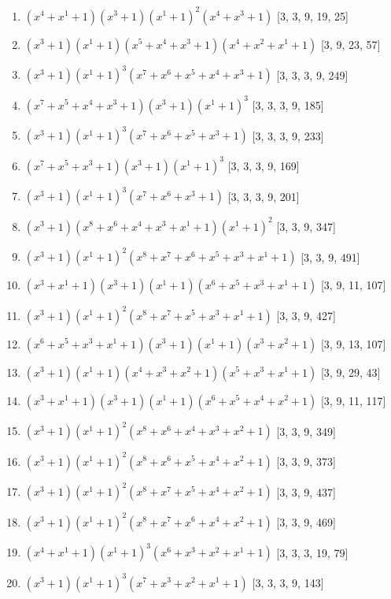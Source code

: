 \documentclass[10pt,twocolumn]{article}
\begin{document}
\begin{enumerate}
\item $(x^{4} + x^{1} + 1)(x^{3} + 1)(x^{1} + 1)^{2}(x^{4} + x^{3} + 1)$  [3, 3, 9, 19, 25]
\item $(x^{3} + 1)(x^{1} + 1)(x^{5} + x^{4} + x^{3} + 1)(x^{4} + x^{2} + x^{1} + 1)$  [3, 9, 23, 57]
\item $(x^{3} + 1)(x^{1} + 1)^{3}(x^{7} + x^{6} + x^{5} + x^{4} + x^{3} + 1)$  [3, 3, 3, 9, 249]
\item $(x^{7} + x^{5} + x^{4} + x^{3} + 1)(x^{3} + 1)(x^{1} + 1)^{3}$  [3, 3, 3, 9, 185]
\item $(x^{3} + 1)(x^{1} + 1)^{3}(x^{7} + x^{6} + x^{5} + x^{3} + 1)$  [3, 3, 3, 9, 233]
\item $(x^{7} + x^{5} + x^{3} + 1)(x^{3} + 1)(x^{1} + 1)^{3}$  [3, 3, 3, 9, 169]
\item $(x^{3} + 1)(x^{1} + 1)^{3}(x^{7} + x^{6} + x^{3} + 1)$  [3, 3, 3, 9, 201]
\item $(x^{3} + 1)(x^{8} + x^{6} + x^{4} + x^{3} + x^{1} + 1)(x^{1} + 1)^{2}$  [3, 3, 9, 347]
\item $(x^{3} + 1)(x^{1} + 1)^{2}(x^{8} + x^{7} + x^{6} + x^{5} + x^{3} + x^{1} + 1)$  [3, 3, 9, 491]
\item $(x^{3} + x^{1} + 1)(x^{3} + 1)(x^{1} + 1)(x^{6} + x^{5} + x^{3} + x^{1} + 1)$  [3, 9, 11, 107]
\item $(x^{3} + 1)(x^{1} + 1)^{2}(x^{8} + x^{7} + x^{5} + x^{3} + x^{1} + 1)$  [3, 3, 9, 427]
\item $(x^{6} + x^{5} + x^{3} + x^{1} + 1)(x^{3} + 1)(x^{1} + 1)(x^{3} + x^{2} + 1)$  [3, 9, 13, 107]
\item $(x^{3} + 1)(x^{1} + 1)(x^{4} + x^{3} + x^{2} + 1)(x^{5} + x^{3} + x^{1} + 1)$  [3, 9, 29, 43]
\item $(x^{3} + x^{1} + 1)(x^{3} + 1)(x^{1} + 1)(x^{6} + x^{5} + x^{4} + x^{2} + 1)$  [3, 9, 11, 117]
\item $(x^{3} + 1)(x^{1} + 1)^{2}(x^{8} + x^{6} + x^{4} + x^{3} + x^{2} + 1)$  [3, 3, 9, 349]
\item $(x^{3} + 1)(x^{1} + 1)^{2}(x^{8} + x^{6} + x^{5} + x^{4} + x^{2} + 1)$  [3, 3, 9, 373]
\item $(x^{3} + 1)(x^{1} + 1)^{2}(x^{8} + x^{7} + x^{5} + x^{4} + x^{2} + 1)$  [3, 3, 9, 437]
\item $(x^{3} + 1)(x^{1} + 1)^{2}(x^{8} + x^{7} + x^{6} + x^{4} + x^{2} + 1)$  [3, 3, 9, 469]
\item $(x^{4} + x^{1} + 1)(x^{1} + 1)^{3}(x^{6} + x^{3} + x^{2} + x^{1} + 1)$  [3, 3, 3, 19, 79]
\item $(x^{3} + 1)(x^{1} + 1)^{3}(x^{7} + x^{3} + x^{2} + x^{1} + 1)$  [3, 3, 3, 9, 143]

\end{enumerate}
\end{document}

